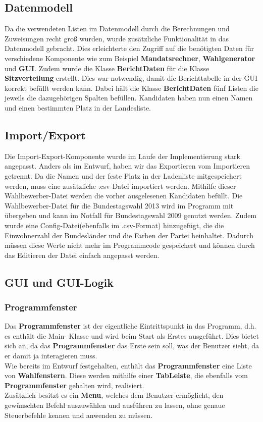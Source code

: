 \documentclass[12pt,a4paper,titlepage]{article}
\newcommand{\myma}{\fontfamily{pcr}\selectfont \textbf}
\begin{document}
\subsection{Datenmodell}
Da die verwendeten Listen im Datenmodell durch die Berechnungen und Zuweisungen recht groß wurden, wurde zusätzliche Funktionalität in das Datenmodell gebracht. Dies erleichterte den Zugriff auf die benötigten Daten für verschiedene Komponente wie zum Beispiel {\myma{Mandatsrechner}}, {\myma{Wahlgenerator}} und {\myma{GUI}}.
Zudem wurde die Klasse {\myma{BerichtDaten}} für die Klasse {\myma{Sitzverteilung}} erstellt. Dies war notwendig, damit die Berichttabelle in der GUI korrekt befüllt werden kann. Dabei hält die Klasse {\myma{BerichtDaten}} fünf Listen die jeweils die dazugehörigen Spalten befüllen. 
Kandidaten haben nun einen Namen und einen bestimmten Platz in der Landesliste.
\subsection{Import/Export}	
Die Import-Export-Komponente wurde im Laufe der Implementierung stark angepasst. Anders als im Entwurf, haben wir das Exportieren vom Importieren getrennt. Da die Namen und der feste Platz in der Ladenliste mitgespeichert werden, muss eine zusätzliche .csv-Datei importiert werden. Mithilfe dieser Wahlbewerber-Datei werden die vorher ausgelesenen Kandidaten befüllt. Die Wahlbewerber-Datei für die Bundestagswahl 2013 wird im Programm mit übergeben und kann im Notfall für Bundestagswahl 2009 genutzt werden. Zudem wurde eine Config-Datei(ebenfalls im .csv-Format) hinzugefügt, die die Einwohnerzahl der Bundesländer und die Farben der Partei beinhaltet. Dadurch müssen diese Werte nicht mehr im Programmcode gespeichert und können durch das Editieren der Datei einfach angepasst werden. 

\subsection{GUI und GUI-Logik}
\subsubsection{Programmfenster}
Das {\myma{Programmfenster}} ist der eigentliche Eintrittspunkt in das Programm, d.h. es enthält die Main- Klasse und wird beim Start als Erstes ausgeführt. Dies bietet sich an, da das {\myma{Programmfenster}} das Erste sein soll, was der Benutzer sieht, da er damit ja interagieren muss. \\
Wie bereits im Entwurf festgehalten, enthält das {\myma{Programmfenster}} eine Liste von {\myma{Wahlfenstern}}. Diese werden mithilfe einer {\myma{TabLeiste}}, die ebenfalls vom {\myma{Programmfenster}} gehalten wird, realisiert. \\
Zusätzlich besitzt es ein {\myma{Menu}}, welches dem Benutzer ermöglicht, den gewünschten Befehl auszuwählen und ausführen zu lassen, ohne genaue Steuerbefehle kennen und anwenden zu müssen. \\
\end{document}

